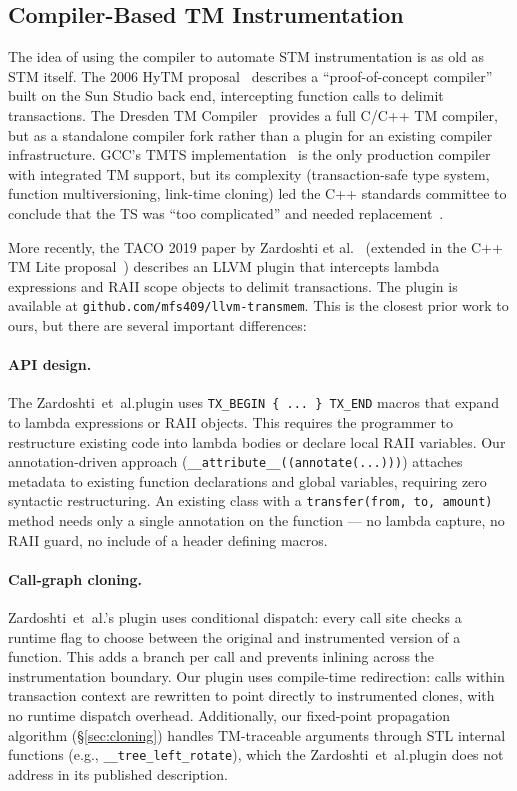 \documentclass[article,12pt]{article}
\newcommand{\ZardoshtiEtAl}{Zardoshti~et~al.}
\begin{document}
\subsection{Compiler-Based TM Instrumentation}

The idea of using the compiler to automate STM instrumentation is as old as STM itself.
The 2006 HyTM proposal~\cite{HyTM} describes a ``proof-of-concept compiler'' built on the
Sun Studio back end, intercepting function calls to delimit transactions.  The Dresden TM
Compiler~\cite{DTMC} provides a full C/C++ TM compiler, but as a standalone compiler
fork rather than a plugin for an existing compiler infrastructure.  GCC's TMTS
implementation~\cite{TMTS} is the only production compiler with integrated TM support,
but its complexity (transaction-safe type system, function multiversioning, link-time
cloning) led the C++ standards committee to conclude that the TS was ``too complicated''
and needed replacement~\cite{P1875}.

More recently, the TACO 2019 paper by Zardoshti et al.~\cite{Zardoshti2019} (extended
in the C++ TM Lite proposal~\cite{P1875}) describes an LLVM plugin that intercepts
lambda expressions and RAII scope objects to delimit transactions.  The plugin is
available at \texttt{github.com/mfs409/llvm-transmem}.  This is the closest prior
work to ours, but there are several important differences:

\paragraph{API design.}  The \ZardoshtiEtAl plugin uses \texttt{TX\_BEGIN \{ ... \} TX\_END} macros
that expand to lambda expressions or RAII objects.  This requires the programmer to
restructure existing code into lambda bodies or declare local RAII variables.  Our
annotation-driven approach (\texttt{\_\_attribute\_\_((annotate(...)))}) attaches metadata
to existing function declarations and global variables, requiring zero syntactic
restructuring.  An existing class with a \texttt{transfer(from, to, amount)} method
needs only a single annotation on the function --- no lambda capture, no RAII guard,
no include of a header defining macros.

\paragraph{Call-graph cloning.}  \ZardoshtiEtAl's plugin uses conditional dispatch: every call
site checks a runtime flag to choose between the original and instrumented version
of a function.  This adds a branch per call and prevents inlining across the
instrumentation boundary.  Our plugin uses compile-time redirection: calls within
transaction context are rewritten to point directly to instrumented clones, with
no runtime dispatch overhead.  Additionally, our fixed-point propagation
algorithm (\S\ref{sec:cloning}) handles TM-traceable arguments through STL
internal functions (e.g., \texttt{\_\_tree\_left\_rotate}), which the \ZardoshtiEtAl plugin
does not address in its published description.
\end{document}
